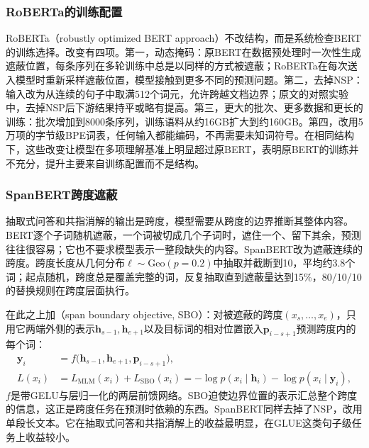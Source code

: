 \subsubsection{RoBERTa的训练配置}
\label{sec:nlp-classical-roberta}

RoBERTa（robustly optimized BERT approach）不改结构，而是系统检查BERT的训练选择。改变有四项。第一，动态掩码：原BERT在数据预处理时一次性生成遮蔽位置，每条序列在多轮训练中总是以同样的方式被遮蔽；RoBERTa在每次送入模型时重新采样遮蔽位置，模型接触到更多不同的预测问题。第二，去掉NSP：输入改为从连续的句子中取满512个词元，允许跨越文档边界；原文的对照实验中，去掉NSP后下游结果持平或略有提高。第三，更大的批次、更多数据和更长的训练：批次增加到8000条序列，训练语料从约16GB扩大到约160GB。第四，改用5万项的字节级BPE词表，任何输入都能编码，不再需要未知词符号。在相同结构下，这些改变让模型在多项理解基准上明显超过原BERT，表明原BERT的训练并不充分，提升主要来自训练配置而不是结构。

\subsubsection{SpanBERT跨度遮蔽}
\label{sec:nlp-classical-spanbert}

抽取式问答和共指消解的输出是跨度，模型需要从跨度的边界推断其整体内容。BERT逐个子词随机遮蔽，一个词被切成几个子词时，遮住一个、留下其余，预测往往很容易；它也不要求模型表示一整段缺失的内容。SpanBERT改为遮蔽连续的跨度。跨度长度从几何分布$\ell\sim\mathrm{Geo}(p=0.2)$中抽取并截断到10，平均约3.8个词；起点随机，跨度总是覆盖完整的词，反复抽取直到遮蔽量达到15\%，80/10/10的替换规则在跨度层面执行。

在此之上加（span boundary objective, SBO）：对被遮蔽的跨度$(x_s,\ldots,x_e)$，只用它两端外侧的表示$\bm h_{s-1},\bm h_{e+1}$以及目标词的相对位置嵌入$\bm p_{i-s+1}$预测跨度内的每个词：
\begin{equation}
  \begin{aligned}
    \bm y_i&=f\bigl(\bm h_{s-1},\bm h_{e+1},\bm p_{i-s+1}\bigr),\\
    L(x_i)&=L_{\mathrm{MLM}}(x_i)+L_{\mathrm{SBO}}(x_i)=-\log p(x_i\mid\bm h_i)-\log p(x_i\mid\bm y_i),
  \end{aligned}
  \label{eq:nlp-classical-sbo}
\end{equation}
$f$是带GELU与层归一化的两层前馈网络。SBO迫使边界位置的表示汇总整个跨度的信息，这正是跨度任务在预测时依赖的东西。SpanBERT同样去掉了NSP，改用单段长文本。它在抽取式问答和共指消解上的收益最明显，在GLUE这类句子级任务上收益较小。

